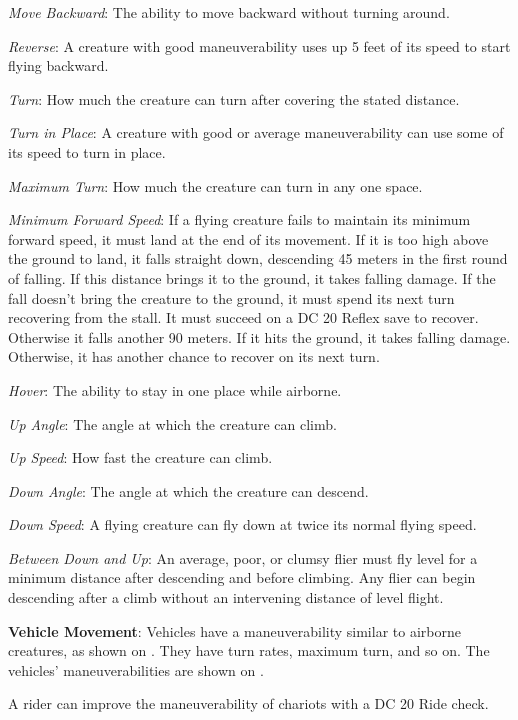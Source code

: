 \textit{Move Backward}: The ability to move backward without turning around.

\textit{Reverse}: A creature with good maneuverability uses up 5 feet of its speed to start flying backward.

\textit{Turn}: How much the creature can turn after covering the stated distance.

\textit{Turn in Place}: A creature with good or average maneuverability can use some of its speed to turn in place.

\textit{Maximum Turn}: How much the creature can turn in any one space.

\textit{Minimum Forward Speed}: If a flying creature fails to maintain its minimum forward speed, it must land at the end of its movement. If it is too high above the ground to land, it falls straight down, descending 45 meters in the first round of falling. If this distance brings it to the ground, it takes falling damage. If the fall doesn't bring the creature to the ground, it must spend its next turn recovering from the stall. It must succeed on a DC 20 Reflex save to recover. Otherwise it falls another 90 meters. If it hits the ground, it takes falling damage. Otherwise, it has another chance to recover on its next turn.

\textit{Hover}: The ability to stay in one place while airborne.

\textit{Up Angle}: The angle at which the creature can climb.

\textit{Up Speed}: How fast the creature can climb.

\textit{Down Angle}: The angle at which the creature can descend.

\textit{Down Speed}: A flying creature can fly down at twice its normal flying speed.

\textit{Between Down and Up}: An average, poor, or clumsy flier must fly level for a minimum distance after descending and before climbing. Any flier can begin descending after a climb without an intervening distance of level flight.

\textbf{Vehicle Movement}: Vehicles have a maneuverability similar to airborne creatures, as shown on . They have turn rates, maximum turn, and so on. The vehicles' maneuverabilities are shown on .

A rider can improve the maneuverability of chariots with a DC 20 Ride check.



